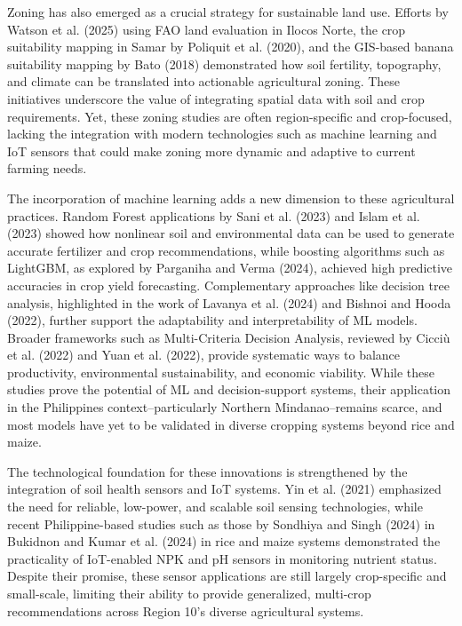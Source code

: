 {Zoning has also emerged as a crucial strategy for sustainable land use. Efforts by Watson et al. (2025) using FAO land evaluation in Ilocos Norte, the crop suitability mapping in Samar by Poliquit et al. (2020), and the GIS-based banana suitability mapping by Bato (2018) demonstrated how soil fertility, topography, and climate can be translated into actionable agricultural zoning. These initiatives underscore the value of integrating spatial data with soil and crop requirements. Yet, these zoning studies are often region-specific and crop-focused, lacking the integration with modern technologies such as machine learning and IoT sensors that could make zoning more dynamic and adaptive to current farming needs.

The incorporation of machine learning adds a new dimension to these agricultural practices. Random Forest applications by Sani et al. (2023)	and Islam et al. (2023) showed how nonlinear soil and environmental data can be used to generate accurate fertilizer and crop recommendations, while boosting algorithms such as LightGBM, as explored by Parganiha and Verma (2024), achieved high predictive accuracies in crop yield forecasting. Complementary approaches like decision tree analysis, highlighted in the work of Lavanya et al. (2024) and Bishnoi and Hooda (2022), further support the adaptability and interpretability of ML models. Broader frameworks such as Multi-Criteria Decision Analysis, reviewed by Cicciù et al. (2022) and Yuan et al. (2022), provide systematic ways to balance productivity, environmental sustainability, and economic viability. While these studies prove the potential of ML and decision-support systems, their application in the Philippines context–particularly Northern Mindanao–remains scarce, and most models have yet to be validated in diverse cropping systems beyond rice and maize.

The technological foundation for these innovations is strengthened by the integration of soil health sensors and IoT systems. Yin et al. (2021) emphasized the need for reliable, low-power, and scalable soil sensing technologies, while recent Philippine-based studies such as those by Sondhiya and Singh (2024) in Bukidnon and Kumar et al. (2024) in rice and maize systems demonstrated the practicality of IoT-enabled NPK and pH sensors in monitoring nutrient status. Despite their promise, these sensor applications are still largely crop-specific and small-scale, limiting their ability to provide generalized, multi-crop recommendations across Region 10’s diverse agricultural systems.

}
